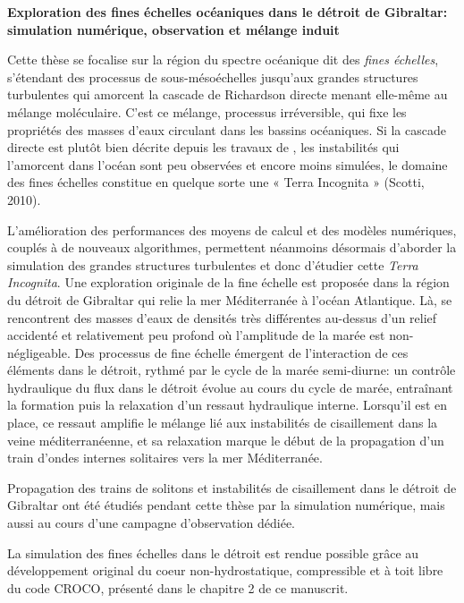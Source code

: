 \documentclass[a4paper,12pt,notitlepage,twoside]{report}
\numberwithin{equation}{section}
\begin{document}
\newpage
\thispagestyle{empty}
\begin{center}
   \textbf{Exploration des fines échelles océaniques dans le détroit de Gibraltar: simulation numérique, observation et mélange induit} 
\end{center} 
Cette thèse se focalise sur la région du spectre océanique dit des \textit{fines échelles}, s'étendant des processus de sous-mésoéchelles jusqu'aux grandes structures turbulentes qui amorcent la cascade de Richardson directe menant elle-même au mélange moléculaire. C’est ce mélange, processus irréversible, qui fixe les propriétés des masses d’eaux circulant dans les bassins océaniques. Si la cascade directe est plutôt bien décrite depuis les travaux de \cite{kolmogorov_local_1941}, les instabilités qui l'amorcent dans l’océan sont peu observées et encore moins simulées, le domaine des fines échelles constitue en quelque sorte une « Terra Incognita » (Scotti, 2010).

L'amélioration des performances des moyens de calcul et des modèles numériques, couplés à de nouveaux algorithmes, permettent néanmoins désormais d’aborder la simulation des grandes structures turbulentes et donc d’étudier cette \textit{Terra Incognita}. Une exploration originale de la fine échelle est proposée dans la région du détroit de Gibraltar qui relie la mer Méditerranée à l’océan Atlantique. Là, se rencontrent des masses d’eaux de densités très différentes au-dessus d’un relief accidenté et relativement peu profond où l’amplitude de la marée est non-négligeable. Des processus de fine échelle émergent de l’interaction de ces éléments dans le détroit, rythmé par le cycle de la marée semi-diurne: un contrôle hydraulique du flux dans le détroit évolue au cours du cycle de marée, entraînant la formation puis la relaxation d’un ressaut hydraulique interne. Lorsqu’il est en place, ce ressaut amplifie le mélange lié aux instabilités de cisaillement dans la veine méditerranéenne, et sa relaxation marque le début de la propagation d’un train d’ondes internes solitaires vers la mer Méditerranée.

Propagation des trains de solitons et instabilités de cisaillement dans le détroit de Gibraltar ont été étudiés pendant cette thèse par la simulation numérique, mais aussi au cours d’une campagne d’observation dédiée. 

La simulation des fines échelles dans le détroit est rendue possible grâce au développement original du coeur non-hydrostatique, compressible et à toit libre du code CROCO, présenté dans le chapitre 2 de ce manuscrit.
\end{document}
